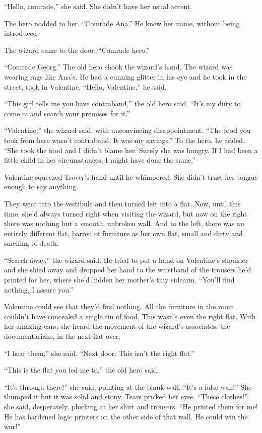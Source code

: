 “Hello, comrade,” she said. She didn’t have her usual accent.

The hero nodded to her. “Comrade Ana.” He knew her name, without
being introduced.

The wizard came to the door. “Comrade hero.”

“Comrade Georg.” The old hero shook the wizard’s hand. The wizard
was wearing rags like Ana’s. He had a cunning glitter in his eye
and he took in the street, took in Valentine. “Hello, Valentine,”
he said.

“This girl tells me you have contraband,” the old hero said. “It’s
my duty to come in and search your premises for it.”

“Valentine,” the wizard said, with unconvincing disappointment.
“The food you took from here wasn’t contraband. It was my savings.”
To the hero, he added, “She took the food and I didn’t blame her.
Surely she was hungry. If I had been a little child in her
circumstances, I might have done the same.”

Valentine squeezed Trover’s hand until he whimpered. She didn’t
trust her tongue enough to say anything.

They went into the vestibule and then turned left into a flat. Now,
until this time, she’d always turned right when visiting the
wizard, but now on the right there was nothing but a smooth,
unbroken wall. And to the left, there was an entirely different
flat, barren of furniture as her own flat, small and dirty and
smelling of death.

“Search away,” the wizard said. He tried to put a hand on
Va\-len\-tine’s shoulder and she shied away and dropped her hand to the
waistband of the trousers he’d printed for her, where she’d hidden
her mother’s tiny sidearm. “You’ll find nothing, I assure you.”

Valentine could see that they’d find nothing. All the furniture in
the room couldn’t have concealed a single tin of food. This wasn’t
even the right flat. With her amazing ears, she heard the movement
of the wizard’s associates, the documentarians, in the next flat
over.

“I hear them,” she said. “Next door. This isn’t the right flat.”

“This is the flat you led me to,” the old hero said.

“It’s through there!” she said, pointing at the blank wall. “It’s a
false wall!” She thumped it but it was solid and stony. Tears
pricked her eyes. “These clothes!” she said, desperately, plucking
at her shirt and trousers. “He printed them for me! He has hardened
logic printers on the other side of that wall. He could win the
war!”

